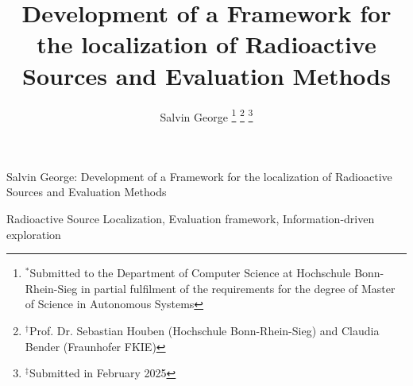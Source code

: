 \documentclass[lettersize,journal]{IEEEtran}
\begin{document}
\title{Development of a Framework for the localization of Radioactive Sources and Evaluation Methods}

\author{Salvin George
\thanks{$^*$Submitted to the Department of Computer Science at Hochschule Bonn-Rhein-Sieg in partial fulfilment of the requirements for the degree of Master of Science in Autonomous Systems}
\thanks{$^{\dagger}$Prof. Dr. Sebastian Houben (Hochschule Bonn-Rhein-Sieg) and Claudia Bender (Fraunhofer FKIE)}
\thanks{$^{\ddagger}$Submitted in February 2025}} %

%
{Salvin George: Development of a Framework for the localization of Radioactive Sources and Evaluation Methods}

\maketitle



\begin{IEEEkeywords}
Radioactive Source Localization, Evaluation framework, Information-driven exploration
\end{IEEEkeywords}



% 










\end{document}

